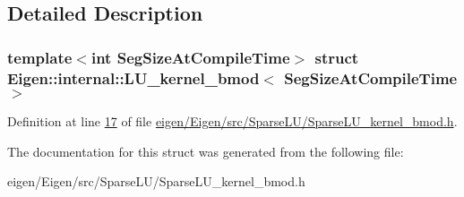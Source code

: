 \subsection{Detailed Description}
\subsubsection*{template$<$int Seg\+Size\+At\+Compile\+Time$>$\newline
struct Eigen\+::internal\+::\+L\+U\+\_\+kernel\+\_\+bmod$<$ Seg\+Size\+At\+Compile\+Time $>$}



Definition at line \hyperlink{eigen_2_eigen_2src_2_sparse_l_u_2_sparse_l_u__kernel__bmod_8h_source_l00017}{17} of file \hyperlink{eigen_2_eigen_2src_2_sparse_l_u_2_sparse_l_u__kernel__bmod_8h_source}{eigen/\+Eigen/src/\+Sparse\+L\+U/\+Sparse\+L\+U\+\_\+kernel\+\_\+bmod.\+h}.



The documentation for this struct was generated from the following file\+:\begin{DoxyCompactItemize}
\item 
eigen/\+Eigen/src/\+Sparse\+L\+U/\+Sparse\+L\+U\+\_\+kernel\+\_\+bmod.\+h\end{DoxyCompactItemize}
